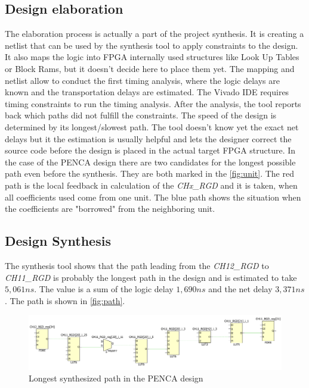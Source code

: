 \subsection{Design elaboration}
The elaboration process is actually a part of the project synthesis. It is creating a netlist that can be used by the synthesis tool to apply constraints to the design. It also maps the logic into FPGA internally used structures like Look Up Tables or Block Rams, but it doesn't decide here to place them yet. The mapping and netlist allow to conduct the first timing analysis, where the logic delays are known and the transportation delays are estimated. The Vivado IDE requires timing constraints to run the timing analysis. After the analysis, the tool reports back which paths did not fulfill the constraints. The speed of the design is determined by its longest/slowest path. The tool doesn't know yet the exact net delays but it the estimation is usually helpful and lets the designer correct the source code before the design is placed in the actual target FPGA structure. In the case of the PENCA design there are two candidates for the longest possible path even before the synthesis. They are both marked in the \autoref{fig:unit}. The red path is the local feedback in calculation of the \textit{CHx\_RGD} and it is taken, when all coefficients used come from one unit. The blue path shows the situation when the coefficients are "borrowed" from the neighboring unit.
\subsection{Design Synthesis}
The synthesis tool shows that the path leading from the \textit{CH12\_RGD} to \textit{CH11\_RGD} is probably the longest path in the design and is estimated to take $5,061 ns$. The value is a sum of the logic delay $1,690 ns$ and the net delay $3,371 ns$. The path is shown in \autoref{fig:path}.

\begin{figure}[h]
\centering
\includegraphics[width=\textwidth]{figures/path.png}
\caption{Longest synthesized path in the PENCA design}
\label{fig:path}
\end{figure}

